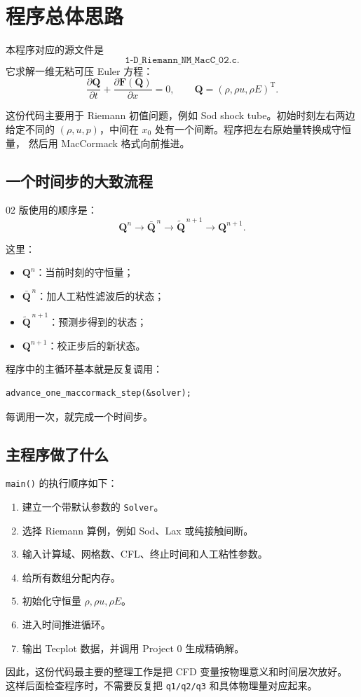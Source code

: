 \section{程序总体思路}

本程序对应的源文件是
\[
\texttt{1-D\_Riemann\_NM\_MacC\_02.c}.
\]
它求解一维无粘可压 Euler 方程：
\[
\frac{\partial \bm Q}{\partial t}
+\frac{\partial \bm F(\bm Q)}{\partial x}=0,
\qquad
\bm Q=(\rho,\rho u,\rho E)^{\mathrm T}.
\]

这份代码主要用于 Riemann 初值问题，例如 Sod shock tube。初始时刻左右两边给定不同的
\((\rho,u,p)\)，中间在 \(x_0\) 处有一个间断。程序把左右原始量转换成守恒量，
然后用 MacCormack 格式向前推进。

\subsection{一个时间步的大致流程}

02 版使用的顺序是：
\[
\bm Q^n
\rightarrow
\bar{\bm Q}^{\,n}
\rightarrow
\tilde{\bm Q}^{\,n+1}
\rightarrow
\bm Q^{n+1}.
\]

这里：
\begin{itemize}
    \item \(\bm Q^n\)：当前时刻的守恒量；
    \item \(\bar{\bm Q}^{\,n}\)：加人工粘性滤波后的状态；
    \item \(\tilde{\bm Q}^{\,n+1}\)：预测步得到的状态；
    \item \(\bm Q^{n+1}\)：校正步后的新状态。
\end{itemize}

程序中的主循环基本就是反复调用：
\begin{lstlisting}
advance_one_maccormack_step(&solver);
\end{lstlisting}
每调用一次，就完成一个时间步。

\subsection{主程序做了什么}

\texttt{main()} 的执行顺序如下：

\begin{enumerate}[label=\arabic*.]
    \item 建立一个带默认参数的 \texttt{Solver}。
    \item 选择 Riemann 算例，例如 Sod、Lax 或纯接触间断。
    \item 输入计算域、网格数、CFL、终止时间和人工粘性参数。
    \item 给所有数组分配内存。
    \item 初始化守恒量 \(\rho,\rho u,\rho E\)。
    \item 进入时间推进循环。
    \item 输出 Tecplot 数据，并调用 Project 0 生成精确解。
\end{enumerate}

因此，这份代码最主要的整理工作是把 CFD 变量按物理意义和时间层次放好。
这样后面检查程序时，不需要反复把 \texttt{q1/q2/q3} 和具体物理量对应起来。
